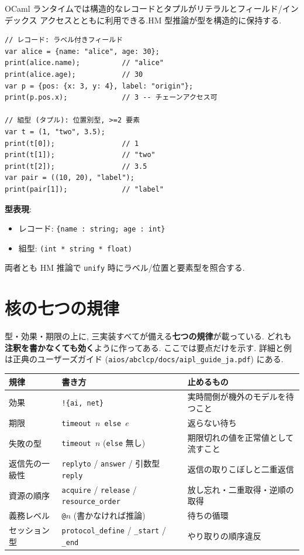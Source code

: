 \documentclass[11pt,a4paper]{article}
\begin{document}
OCaml ランタイムでは構造的なレコードとタプルがリテラルとフィールド/インデックス
アクセスとともに利用できる.HM 型推論が型を構造的に保持する.

\begin{lstlisting}
// レコード: ラベル付きフィールド
var alice = {name: "alice", age: 30};
print(alice.name);          // "alice"
print(alice.age);           // 30
var p = {pos: {x: 3, y: 4}, label: "origin"};
print(p.pos.x);             // 3 -- チェーンアクセス可

// 組型 (タプル): 位置別型, >=2 要素
var t = (1, "two", 3.5);
print(t[0]);                // 1
print(t[1]);                // "two"
print(t[2]);                // 3.5
var pair = ((10, 20), "label");
print(pair[1]);             // "label"
\end{lstlisting}

\textbf{型表現}:

\begin{itemize}
  \item レコード: \texttt{\{name : string; age : int\}}
  \item 組型: \texttt{(int * string * float)}
\end{itemize}

両者とも HM 推論で \texttt{unify} 時にラベル/位置と要素型を照合する.

\section{核の七つの規律}

型・効果・期限の上に, 三実装すべてが備える\textbf{七つの規律}が載っている.
どれも\textbf{注釈を書かなくても効く}ように作ってある.
ここでは要点だけを示す. 詳細と例は正典のユーザーズガイド
(\texttt{aios/abclcp/docs/aipl\_guide\_ja.pdf}) にある.

\begin{center}
\small
\begin{tabular}{@{}lp{5.0cm}p{4.6cm}@{}}
\toprule
規律 & 書き方 & 止めるもの \\
\midrule
効果 & \texttt{!\{ai, net\}} & 実時間側が機外のモデルを待つこと \\
期限 & \texttt{timeout $n$ else $e$} & 返らない待ち \\
失敗の型 & \texttt{timeout $n$} (\texttt{else} 無し) & 期限切れの値を正常値として流すこと \\
返信先の一級性 & \texttt{replyto} / \texttt{answer} / 引数型 \texttt{reply} & 返信の取りこぼしと二重返信 \\
資源の順序 & \texttt{acquire} / \texttt{release} / \texttt{resource\_order} & 放し忘れ・二重取得・逆順の取得 \\
義務レベル & \texttt{@$n$} (書かなければ推論) & 待ちの循環 \\
セッション型 & \texttt{protocol\_define} / \texttt{\_start} / \texttt{\_end} & やり取りの順序違反 \\
\bottomrule
\end{tabular}
\end{center}
\end{document}
